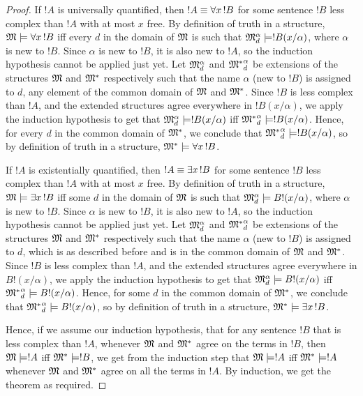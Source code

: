 \documentclass[syntax-and-semantics]{subfiles}
\begin{document}
\begin{proof}

If $!A$ is universally quantified, then $!A \ident \lforall[x][!B]$ for some sentence $!B$ less complex than $!A$ with at most $x$ free. By definition of truth in a structure, $\Struct{M} \Sat \lforall[x][!B]$ iff every $d$ in the domain of $\mathfrak{M}$ is such that $\mathfrak{M}^\alpha_d \models !B(x/\alpha)$, where $\alpha$ is new to $!B$. Since $\alpha$ is new to $!B$, it is also new to $!A$, so the induction hypothesis cannot be applied just yet. Let $\mathfrak{M}^\alpha_d$ and ${\mathfrak{M}^*}^\alpha_d$ be extensions of the structures $\mathfrak{M}$ and $\mathfrak{M}^*$ respectively such that the name $\alpha$ (new to $!B$) is assigned to $d$, any element of the common domain of $\mathfrak{M}$ and $\mathfrak{M}^*$. Since $!B$ is less complex than $!A$, and the extended structures agree everywhere in $!B(x/\alpha)$, we apply the induction hypothesis to get that $\mathfrak{M}^\alpha_d \models !B(x/\alpha)$ iff ${\mathfrak{M}^*}^\alpha_d \models !B(x/\alpha)$. Hence, for every $d$ in the common domain of $\mathfrak{M}^*$, we conclude that ${\mathfrak{M}^*}^\alpha_d \models !B(x/\alpha)$, so by definition of truth in a structure, $\Struct{M}^* \Sat \lforall[x][!B]$.  

If $!A$ is existentially quantified, then $!A \ident \lexists[x][!B]$ for some sentence $!B$ less complex than $!A$ with at most $x$ free. By definition of truth in a structure, $\Struct{M} \Sat \lexists[x][!B]$ iff some $d$ in the domain of $\mathfrak{M}$ is such that $\mathfrak{M}^\alpha_d \models B!(x/\alpha)$, where $\alpha$ is new to $!B$. Since $\alpha$ is new to $!B$, it is also new to $!A$, so the induction hypothesis cannot be applied just yet. Let $\mathfrak{M}^\alpha_d$ and ${\mathfrak{M}^*}^\alpha_d$ be extensions of the structures $\mathfrak{M}$ and $\mathfrak{M}^*$ respectively such that the name $\alpha$ (new to $!B$) is assigned to $d$, which is as described before and is in the common domain of $\mathfrak{M}$ and $\mathfrak{M}^*$. Since $!B$ is less complex than $!A$, and the extended structures agree everywhere in $B!(x/\alpha)$, we apply the induction hypothesis to get that $\mathfrak{M}^\alpha_d \models B!(x/\alpha)$ iff ${\mathfrak{M}^*}^\alpha_d \models B!(x/\alpha)$. Hence, for some $d$ in the common domain of $\mathfrak{M}^*$, we conclude that ${\mathfrak{M}^*}^\alpha_d \models B!(x/\alpha)$, so by definition of truth in a structure, $\Struct{M}^* \Sat \lexists[x][!B]$.

Hence, if we assume our induction hypothesis, that for any sentence $!B$ that is less complex than $!A$, whenever $\mathfrak{M}$ and $\mathfrak{M}^*$ agree on the terms in $!B$, then $\mathfrak{M}\models !A$ iff $\mathfrak{M}^* \models !B$, we get from the induction step that $\mathfrak{M} \models !A$ iff $\mathfrak{M}^* \models !A$ whenever $\mathfrak{M}$ and $\mathfrak{M}^*$ agree on all the terms in $!A$. By induction, we get the theorem as required.
\end{proof}
\end{document}
